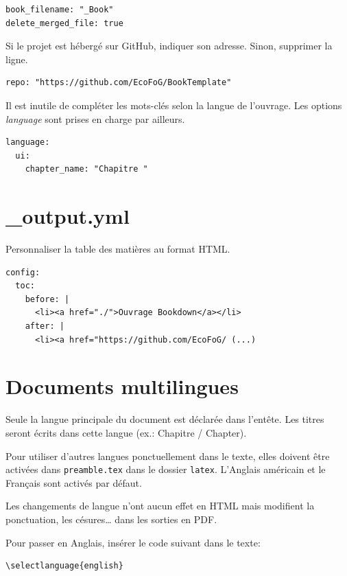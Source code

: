 \documentclass[
  11pt,
  american,
  a4paper,
  extrafontsizes,onecolumn,openright
  ]{memoir}
\begin{document}
\begin{verbatim}
book_filename: "_Book"
delete_merged_file: true
\end{verbatim}

Si le projet est hébergé sur GitHub, indiquer son adresse.
Sinon, supprimer la ligne.

\begin{verbatim}
repo: "https://github.com/EcoFoG/BookTemplate"
\end{verbatim}

Il est inutile de compléter les mots-clés selon la langue de l'ouvrage.
Les options \emph{language} sont prises en charge par ailleurs.

\begin{verbatim}
language:
  ui:
    chapter_name: "Chapitre "
\end{verbatim}

\hypertarget{output.yml}{%
\section{\_output.yml}\label{output.yml}}

Personnaliser la table des matières au format HTML.

\begin{verbatim}
config:
  toc:
    before: |
      <li><a href="./">Ouvrage Bookdown</a></li>
    after: |
      <li><a href="https://github.com/EcoFoG/ (...)
\end{verbatim}

\hypertarget{documents-multilingues}{%
\section{Documents multilingues}\label{documents-multilingues}}

Seule la langue principale du document est déclarée dans l'entête.
Les titres seront écrits dans cette langue (ex.: Chapitre / Chapter).

Pour utiliser d'autres langues ponctuellement dans le texte, elles doivent être activées dans \texttt{preamble.tex} dans le dossier \texttt{latex}.
L'Anglais américain et le Français sont activés par défaut.

Les changements de langue n'ont aucun effet en HTML mais modifient la ponctuation, les césures\ldots{} dans les sorties en PDF.

Pour passer en Anglais, insérer le code suivant dans le texte:

\begin{verbatim}
\selectlanguage{english}
\end{verbatim}
\end{document}
